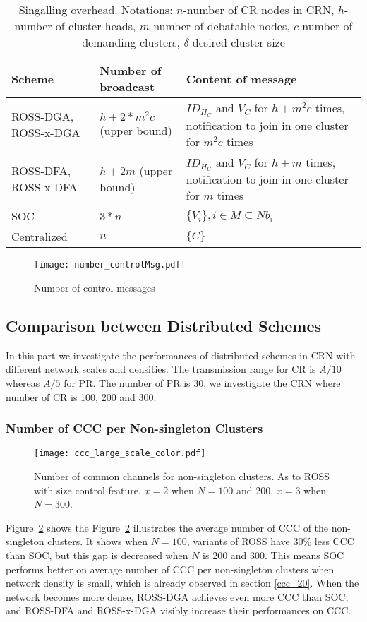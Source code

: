 \begin{table}[hc]
\center
\begin{tabular}{|p{3 cm}|p{3 cm}|p{7.5 cm}|}
\hline
 Scheme 		&   Number of broadcast  	& Content of message \\ \hline
 ROSS-DGA, ROSS-x-DGA 		&   $h+2*m^2c$  (upper bound)				& $ID_{H_C}$ and $V_C$ for $h+m^2c$ times, notification to join in one cluster for $m^2c$ times					\\ \hline
 ROSS-DFA, ROSS-x-DFA 		&   $h+ 2m$	 (upper bound)				& $ID_{H_C}$ and $V_C$ for $h+m$ times, notification to join in one cluster for $m$ times	 					\\ \hline
 SOC 			&   $3*n$					& $\{V_i\}, i\in M\subseteq Nb_i$						\\ \hline
 Centralized	&	$n$						& $\{C\}$         	\\ \hline
\end{tabular}
\caption{Singalling overhead. Notations: $n$-number of CR nodes in CRN, $h$-number of cluster heads, $m$-number of debatable nodes, $c$-number of demanding clusters, $\delta$-desired cluster size}
\label{tab_overhead}
\end{table}


\begin{figure}[ht!]
  \centering
  \texttt{[image: number\_controlMsg.pdf]}
  \caption{Number of control messages}
  \label{control_msg}
\end{figure}


\subsection{Comparison between Distributed Schemes}
In this part we investigate the performances of distributed schemes in CRN with different network scales and densities.
The transmission range for CR is $A/10$ whereas $A/5$ for PR.
The number of PR is 30, we investigate the CRN where number of CR is 100, 200 and 300.


\subsubsection{Number of CCC per Non-singleton Clusters}

\begin{figure}[ht!]
  \centering
  \texttt{[image: ccc\_large\_scale\_color.pdf]}
  \caption{Number of common channels for non-singleton clusters. As to ROSS with size control feature, $x=2$ when $N=100$ and 200, $x=3$ when $N=300$.}
  \label{ccc_large_scale}
\end{figure}
Figure~\ref{ccc_large_scale} shows the 
Figure~\ref{ccc_large_scale} illustrates the average number of CCC of the non-singleton clusters.
It shows when $N=100$, variants of ROSS have 30\% less CCC than SOC, but this gap is decreased when $N$ is 200 and 300.
This means SOC performs better on average number of CCC per non-singleton clusters when network density is small, which is already observed in section \ref{ccc_20}.
When the network becomes more dense, ROSS-DGA achieves even more CCC than SOC, and ROSS-DFA and ROSS-x-DGA visibly increase their performances on CCC.



